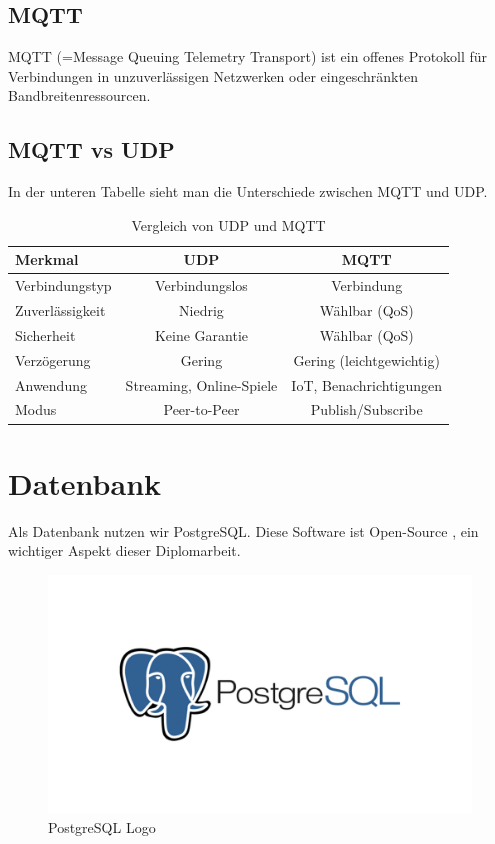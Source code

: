\subsection{MQTT}
MQTT (=Message Queuing Telemetry Transport) ist ein offenes Protokoll für Verbindungen in unzuverlässigen Netzwerken oder eingeschränkten Bandbreitenressourcen. \parencite{MQTT}

\subsection{MQTT vs UDP}
In der unteren Tabelle sieht man die Unterschiede zwischen MQTT und UDP.
\begin{table}[H]
	\centering
	\begin{tabular}{|l|c|c|}
		\hline
		\textbf{Merkmal} & \textbf{UDP} & \textbf{MQTT} \\
		\hline
		Verbindungstyp & Verbindungslos & Verbindung \\
		\hline
		Zuverlässigkeit & Niedrig & Wählbar (QoS) \\
		\hline
		Sicherheit & Keine Garantie & Wählbar (QoS) \\
		\hline
		Verzögerung & Gering & Gering (leichtgewichtig) \\
		\hline
		Anwendung & Streaming, Online-Spiele & IoT, Benachrichtigungen \\
		\hline
		Modus & Peer-to-Peer & Publish/Subscribe \\
		\hline
	\end{tabular}
	\caption{Vergleich von UDP und MQTT}
	\label{tab:udp_mqtt}
	\textcite{MQTTvsUDP}
\end{table}

\newpage
\section{Datenbank}
Als Datenbank nutzen wir PostgreSQL. Diese Software ist Open-Source \parencite{PostgreSQL}, ein wichtiger Aspekt dieser Diplomarbeit. 

\begin{figure}[H]
	\centering
	\includegraphics[width=0.5\linewidth]{images/postgres-logo.png}
	\caption[PostgreSQL Logo]{PostgreSQL Logo}
	\label{fig:PostgreSQLLogo}
\end{figure}

